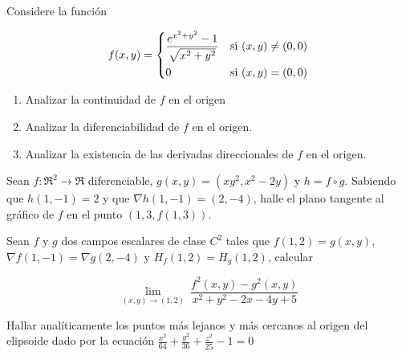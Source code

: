 
\begin{question}
    Considere la función

     \[
        f(x,y) =
        \begin{dcases}
            \frac{e^{x^{2}+y^{2}}-1}{\sqrt{x^{2}+y^{2}}} & \textnormal{si}\ (x,y) \neq (0,0) \\
            0                         & \textnormal{si}\ (x,y) = (0,0)
        \end{dcases}
    \]

    \begin{enumerate}
        \item Analizar la continuidad de $f$ en el origen
        \item Analizar la diferenciabilidad de $f$ en el origen.
        \item Analizar la existencia de las derivadas direccionales de $f$ en el origen.\\
    \end{enumerate}
\end{question}

\begin{question}
    Sean $f:\Re^{2}\to\Re$ diferenciable, $g(x,y)=(xy^2,x^2-2y)$ y $h=f\circ g$. Sabiendo que $h(1,-1) = 2$ y que $\nabla h(1,-1)=(2,-4)$, halle el plano tangente al gráfico de $f$ en el punto $(1,3,f(1,3))$.
\end{question}
\begin{question}
    Sean $f$ y $g$ dos campos escalares de clase $C^2$ tales que $f(1,2)=g(x,y)$, $\nabla f(1,-1)=\nabla g(2,-4)$ y $H_f(1,2)=H_g(1,2)$, calcular 
    
\[
        \lim_{(x,y)\to(1,2)} \
        \frac{f^2(x,y)-g^2(x,y)}{x^2+y^2-2x-4y+5}
    \]
\end{question}
\begin{question}
    Hallar analíticamente los puntos más lejanos y más cercanos al origen del elipsoide dado por la ecuación {\large$\frac{x^2}{64}+\frac{y^2}{36}+\frac{z^2}{25}-1=0$}
\end{question}
\newpage

